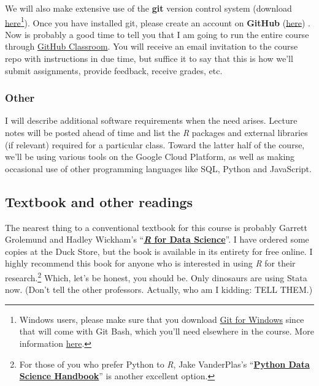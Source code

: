 \documentclass[12]{article}
\begin{document}
We will also make extensive use of the \textbf{git} version control system (download \href{https://git-scm.com/downloads}{here}\footnote{Windows users, please make sure that you download \href{https://gitforwindows.org/}{Git for Windows} since that will come with Git Bash, which you'll need elsewhere in the course. More information \href{http://happygitwithr.com/install-git.html\#install-git-windows}{here}.}). Once you have installed git, please create an account on \textbf{GitHub} (\href{https://github.com/join}{here})%
. Now is probably a good time to tell you that I am going to run the entire course through \href{https://classroom.github.com/}{GitHub Classroom}. You will receive an email invitation to the course repo with instructions in due time, but suffice it to say that this is how we'll submit assignments, provide feedback, receive grades, etc.

\vspace{-0.25cm}
\subsubsection*{Other}

I will describe additional software requirements when the need arises. Lecture notes will be posted ahead of time and list the \textit{R} packages and external libraries (if relevant) required for a particular class. Toward the latter half of the course, we'll be using various tools on the Google Cloud Platform, as well as making occasional use of other programming languages like SQL, Python and JavaScript.

\subsection*{Textbook and other readings}

The nearest thing to a conventional textbook for this course is probably Garrett Grolemund and Hadley Wickham's ``\href{http://r4ds.had.co.nz}{\textbf{\textit{R} for Data Science}}''. I have ordered some copies at the Duck Store, but the book is available in its entirety for free online. I highly recommend this book for anyone who is interested in using \textit{R} for their research.\footnote{For those of you who prefer Python to \textit{R}, Jake VanderPlas's ``\href{https://jakevdp.github.io/PythonDataScienceHandbook/}{\textbf{Python Data Science Handbook}}'' is another excellent option.} Which, let's be honest, you should be. Only dinosaurs are using Stata now. (Don't tell the other professors. Actually, who am I kidding: TELL THEM.)
\end{document}
